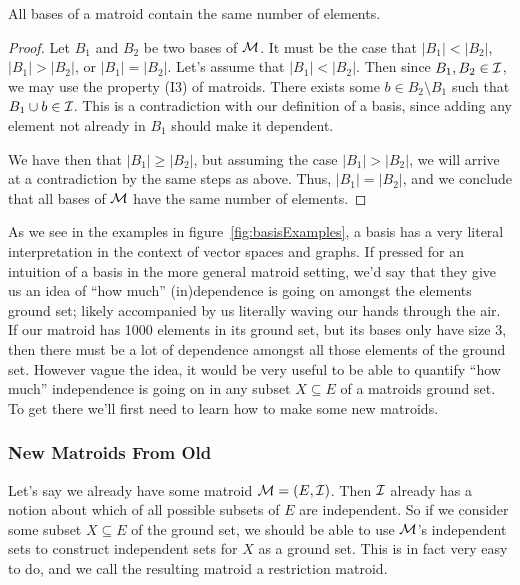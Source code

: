 \documentclass[12pt,oneside]{../../sfsuthesis}
\begin{document}
\begin{proposition}\th\label{thm:basesSameSize}
    All bases of a matroid contain the same number of elements.
\end{proposition}

\begin{proof}
    Let \( B_1 \) and \( B_2 \) be two bases of \( \mathcal{M} \).
    It must be the case that  \( |B_1| < |B_2| \), \( |B_1| > |B_2| \), or \( |B_1| = |B_2| \).
    Let's assume that  \( |B_1| < |B_2| \).
    Then since \( B_1, B_2 \in \mathcal{I} \), we may use the property (I3) of matroids.
    There exists some \( b \in B_2 \setminus B_1 \) such that \( B_1 \cup b \in \mathcal{I} \).
    This is a contradiction with our definition of a basis, since adding any element not already in \( B_1 \) should make it dependent.


    We have then that \( |B_1| \geq |B_2| \), but assuming the case \( |B_1| > |B_2| \), we will arrive at a contradiction by the same steps as above.
    Thus, \( |B_1| = |B_2| \), and we conclude that all bases of \( \mathcal{M} \) have the same number of elements.
\end{proof}

As we see in the examples in figure~\ref{fig:basisExamples}, a basis has a very literal interpretation in the context of vector spaces and graphs.
If pressed for an intuition of a basis in the more general matroid setting, we'd say that they give us an idea of ``how much'' (in)dependence is going on amongst the elements ground set; likely accompanied by us literally waving our hands through the air.
If our matroid has 1000 elements in its ground set, but its bases only have size 3, then there must be a lot of dependence amongst all those elements of the ground set.
However vague the idea, it would be very useful to be able to quantify ``how much'' independence is going on in any subset \( X \subseteq E \) of a matroids ground set.
To get there we'll first need to learn how to make some new matroids.

\subsubsection{New Matroids From Old}
Let's say we already have some matroid \( \mathcal{M} = (E, \mathcal{I}) \).
Then \( \mathcal{I} \) already has a notion about which of all possible subsets of \( E \) are independent.
So if we consider some subset \( X \subseteq E \) of the ground set, we should be able to use \( \mathcal{M} \)'s independent sets to construct independent sets for \( X \) as a ground set.
This is in fact very easy to do, and we call the resulting matroid a restriction matroid.
\end{document}
